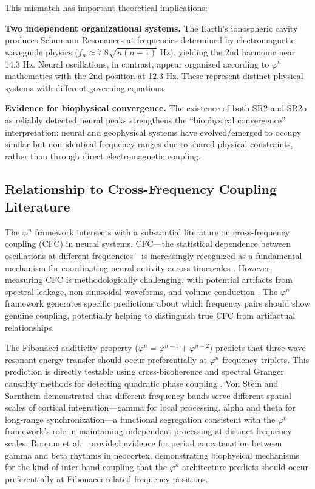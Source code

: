 \documentclass[11pt,a4paper]{article}
\newcommand{\phisym}{\varphi}
\begin{document}
This mismatch has important theoretical implications:

\textbf{Two independent organizational systems.} The Earth's ionospheric cavity produces Schumann Resonances at frequencies determined by electromagnetic waveguide physics ($f_n \approx 7.8\sqrt{n(n+1)}$ Hz), yielding the 2nd harmonic near 14.3 Hz. Neural oscillations, in contrast, appear organized according to $\phisym^n$ mathematics with the 2nd position at 12.3 Hz. These represent distinct physical systems with different governing equations.

\textbf{Evidence for biophysical convergence.} The existence of both SR2 and SR2o as reliably detected neural peaks strengthens the ``biophysical convergence'' interpretation: neural and geophysical systems have evolved/emerged to occupy similar but non-identical frequency ranges due to shared physical constraints, rather than through direct electromagnetic coupling.

\subsection{Relationship to Cross-Frequency Coupling Literature}

The $\phisym^n$ framework intersects with a substantial literature on cross-frequency coupling (CFC) in neural systems. CFC---the statistical dependence between oscillations at different frequencies---is increasingly recognized as a fundamental mechanism for coordinating neural activity across timescales \parencite{jensen2007cross}. However, measuring CFC is methodologically challenging, with potential artifacts from spectral leakage, non-sinusoidal waveforms, and volume conduction \parencite{aru2015untangling}. The $\phisym^n$ framework generates specific predictions about which frequency pairs should show genuine coupling, potentially helping to distinguish true CFC from artifactual relationships.

The Fibonacci additivity property ($\phisym^n = \phisym^{n-1} + \phisym^{n-2}$) predicts that three-wave resonant energy transfer should occur preferentially at $\phisym^n$ frequency triplets. This prediction is directly testable using cross-bicoherence and spectral Granger causality methods for detecting quadratic phase coupling \parencite{abe2024detection}. Von Stein and Sarnthein \parencite{vonstein2000different} demonstrated that different frequency bands serve different spatial scales of cortical integration---gamma for local processing, alpha and theta for long-range synchronization---a functional segregation consistent with the $\phisym^n$ framework's role in maintaining independent processing at distinct frequency scales. Roopun et al.\ \parencite{roopun2008period} provided evidence for period concatenation between gamma and beta rhythms in neocortex, demonstrating biophysical mechanisms for the kind of inter-band coupling that the $\phisym^n$ architecture predicts should occur preferentially at Fibonacci-related frequency positions.
\end{document}
